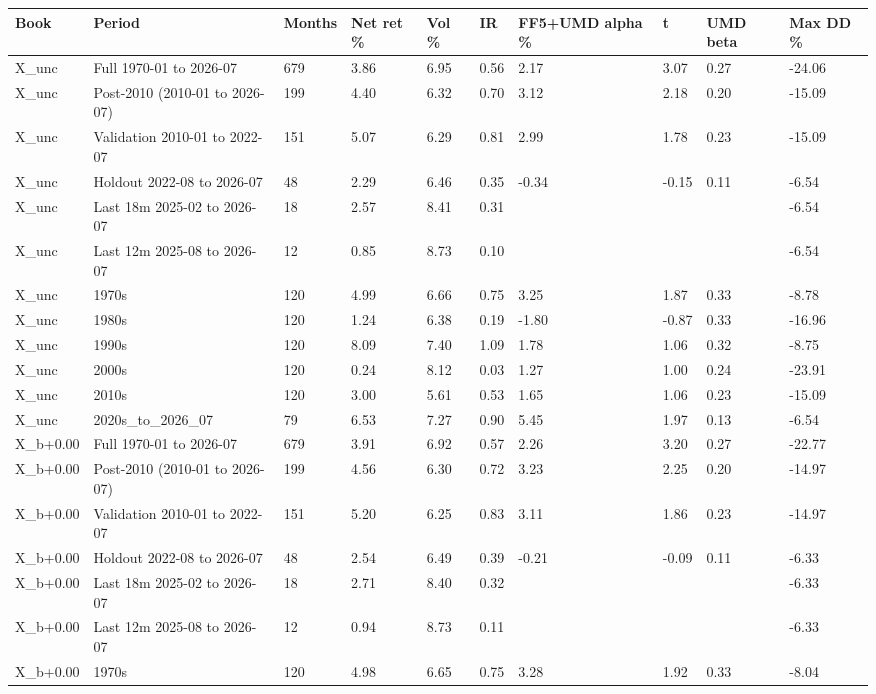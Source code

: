 \begin{tabular}{llllllllll}
\toprule
Book & Period & Months & Net ret \% & Vol \% & IR & FF5+UMD alpha \% & t & UMD beta & Max DD \% \\
\midrule
X\_unc & Full 1970-01 to 2026-07 & 679 & 3.86 & 6.95 & 0.56 & 2.17 & 3.07 & 0.27 & -24.06 \\
X\_unc & Post-2010 (2010-01 to 2026-07) & 199 & 4.40 & 6.32 & 0.70 & 3.12 & 2.18 & 0.20 & -15.09 \\
X\_unc & Validation 2010-01 to 2022-07 & 151 & 5.07 & 6.29 & 0.81 & 2.99 & 1.78 & 0.23 & -15.09 \\
X\_unc & Holdout 2022-08 to 2026-07 & 48 & 2.29 & 6.46 & 0.35 & -0.34 & -0.15 & 0.11 & -6.54 \\
X\_unc & Last 18m 2025-02 to 2026-07 & 18 & 2.57 & 8.41 & 0.31 &  &  &  & -6.54 \\
X\_unc & Last 12m 2025-08 to 2026-07 & 12 & 0.85 & 8.73 & 0.10 &  &  &  & -6.54 \\
X\_unc & 1970s & 120 & 4.99 & 6.66 & 0.75 & 3.25 & 1.87 & 0.33 & -8.78 \\
X\_unc & 1980s & 120 & 1.24 & 6.38 & 0.19 & -1.80 & -0.87 & 0.33 & -16.96 \\
X\_unc & 1990s & 120 & 8.09 & 7.40 & 1.09 & 1.78 & 1.06 & 0.32 & -8.75 \\
X\_unc & 2000s & 120 & 0.24 & 8.12 & 0.03 & 1.27 & 1.00 & 0.24 & -23.91 \\
X\_unc & 2010s & 120 & 3.00 & 5.61 & 0.53 & 1.65 & 1.06 & 0.23 & -15.09 \\
X\_unc & 2020s\_to\_2026\_07 & 79 & 6.53 & 7.27 & 0.90 & 5.45 & 1.97 & 0.13 & -6.54 \\
X\_b+0.00 & Full 1970-01 to 2026-07 & 679 & 3.91 & 6.92 & 0.57 & 2.26 & 3.20 & 0.27 & -22.77 \\
X\_b+0.00 & Post-2010 (2010-01 to 2026-07) & 199 & 4.56 & 6.30 & 0.72 & 3.23 & 2.25 & 0.20 & -14.97 \\
X\_b+0.00 & Validation 2010-01 to 2022-07 & 151 & 5.20 & 6.25 & 0.83 & 3.11 & 1.86 & 0.23 & -14.97 \\
X\_b+0.00 & Holdout 2022-08 to 2026-07 & 48 & 2.54 & 6.49 & 0.39 & -0.21 & -0.09 & 0.11 & -6.33 \\
X\_b+0.00 & Last 18m 2025-02 to 2026-07 & 18 & 2.71 & 8.40 & 0.32 &  &  &  & -6.33 \\
X\_b+0.00 & Last 12m 2025-08 to 2026-07 & 12 & 0.94 & 8.73 & 0.11 &  &  &  & -6.33 \\
X\_b+0.00 & 1970s & 120 & 4.98 & 6.65 & 0.75 & 3.28 & 1.92 & 0.33 & -8.04 \\

\end{tabular}
